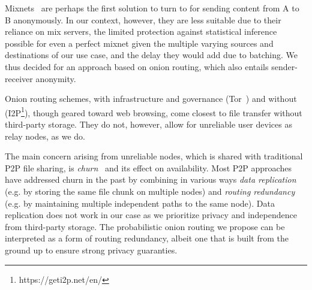 Mixnets~\cite{Chaum:1981} are perhaps the first solution to turn to for sending content from A to B anonymously. In our context, however, they are less suitable due to their reliance on mix servers, the limited protection against statistical inference possible for even a perfect mixnet given the multiple varying sources and destinations of our use case, and the delay they would add due to batching. We thus decided for an approach based on onion routing, which also entails sender-receiver anonymity.

Onion routing schemes, with infrastructure and governance (Tor~\cite{Tor}) and without (I2P\footnote{https://geti2p.net/en/}), though geared toward web browsing, come closest to file transfer without third-party storage. They do not, however, allow for unreliable user devices as relay nodes, as we do. 

The main concern arising from unreliable nodes, which is shared with traditional P2P file sharing, is \emph{churn}~\cite{dhtchurn} and its effect on availability. %
Most P2P approaches have addressed churn in the past by combining in various ways \emph{data replication} (e.g. by storing the same file chunk on multiple nodes) and \emph{routing redundancy} (e.g. by maintaining multiple independent paths to the same node). Data replication does not work in our case as we prioritize privacy and independence from third-party storage. The probabilistic onion routing we propose can be interpreted as a form of routing redundancy, albeit one that is built from the ground up to ensure strong privacy guaranties.





